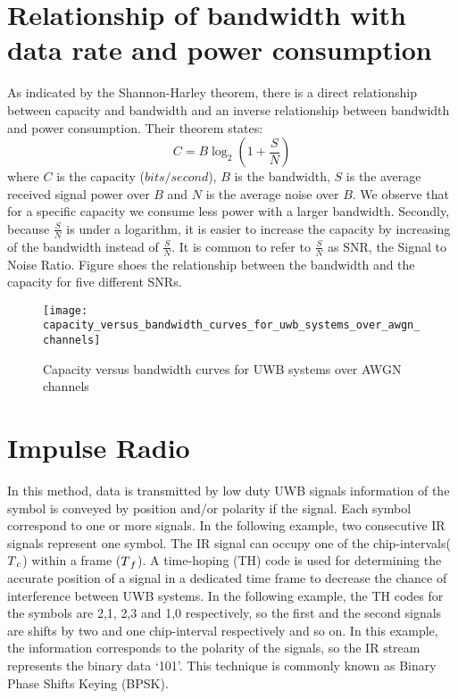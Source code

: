 \documentclass[../../main.tex]{subfiles}
\begin{document}
\section{Relationship of bandwidth with data rate and power consumption}
As indicated by the Shannon-Harley theorem, there is a direct relationship between capacity and bandwidth and an inverse relationship between bandwidth and power consumption. Their theorem states: 
\begin{equation}
    C=B\log_2(1+\frac{S}{N})
\end{equation} where $C$ is the capacity ($bits/second$), $B$ is the bandwidth, $S$ is the average received signal power over $B$ and $N$ is the average noise over $B$. We observe that for a specific capacity we consume less power with a larger bandwidth. Secondly, because $\frac{S}{N}$ is under a logarithm, it is easier to increase the capacity by increasing of the bandwidth instead of $\frac{S}{N}$. It is common to refer to $\frac{S}{N}$ as SNR, the Signal to Noise Ratio. Figure shoes the relationship between the bandwidth and the capacity for five different SNRs.

\begin{figure}[h]
    \centering
    \texttt{[image: capacity\_versus\_bandwidth\_curves\_for\_uwb\_systems\_over\_awgn\_channels]}
    \caption{Capacity versus bandwidth curves for UWB systems over AWGN channels}
    \label{fig:capacity_versus_bandwidth_curves_for_uwb_systems_over_awgn_channels}
\end{figure}

\section{Impulse Radio}
In this method, data is transmitted by low duty UWB signals information of the symbol is conveyed by position and/or polarity if the signal. Each symbol correspond to one or more signals. In the following example, two consecutive IR signals represent one symbol. The IR signal can occupy one of the chip-intervals($T\textsubscript{$c$}$) within a frame ($T\textsubscript{$f$}$). A time-hoping (TH) code is used for determining the accurate position of a signal in a dedicated time frame to decrease the chance of interference between UWB systems. In the following example, the TH codes for the symbols are {2,1}, {2,3} and {1,0} respectively, so the first and the second signals are shifts by two and one chip-interval respectively and so on. In this example, the information corresponds to the polarity of the signals, so the IR stream represents the binary data `101'. This technique is commonly known as Binary Phase Shifts Keying (BPSK).
\end{document}
